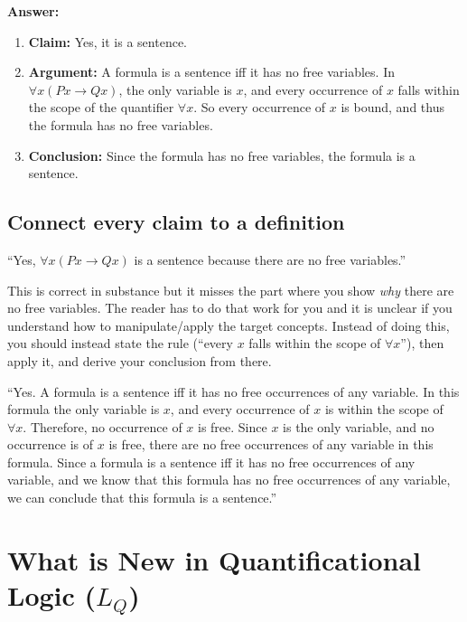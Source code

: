 \documentclass[11pt]{article}
\begin{document}
\begin{example}
\textbf{Answer:}
\begin{enumerate}
    \item \textbf{Claim:} Yes, it is a sentence.
    \item \textbf{Argument:} A formula is a sentence iff it has no free variables. In $\forall x(Px \to Qx)$, the only variable is $x$, and every occurrence of $x$ falls within the scope of the quantifier $\forall x$. So every occurrence of $x$ is bound, and thus the formula has no free variables.
    \item \textbf{Conclusion:} Since the formula has no free variables, the formula is a sentence.
\end{enumerate}
\end{example}

\subsection{Connect every claim to a definition}

\begin{warnbox}
``Yes, $\forall x(Px \to Qx)$ is a sentence because there are no free variables.''
\end{warnbox}

This is correct in substance but it misses the part where you show \emph{why} there are no free variables. The reader has to do that work for you and it is unclear if you understand how to manipulate/apply the target concepts. Instead of doing this, you should instead state the rule (``every $x$ falls within the scope of $\forall x$''), then apply it, and derive your conclusion from there.

\begin{goodbox}
``Yes. A formula is a sentence iff it has no free occurrences of any variable. In this formula the only variable is $x$, and every occurrence of $x$ is within the scope of $\forall x$. Therefore, no occurrence of $x$ is free. Since $x$ is the only variable, and no occurrence is of $x$ is free, there are no free occurrences of any variable in this formula. Since a formula is a sentence iff it has no free occurrences of any variable, and we know that this formula has no free occurrences of any variable, we can conclude that this formula is a sentence.''
\end{goodbox}

\section{What is New in Quantificational Logic ($L_Q$)}
\end{document}

